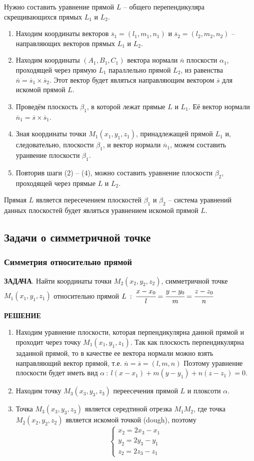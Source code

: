 \documentclass{article}
\begin{document}
Нужно составить уравнение прямой $L$ -- общего перепендикуляра скрещивающихся прямых $L_1$ и $L_2$.
\begin{enumerate}
    \item Находим координаты векторов $\overline{s}_1=(l_1,m_1,n_1)$ и $\overline{s}_2=(l_2,m_2,n_2)$ -- направляющих векторов прямых $L_1$ и $L_2$.
    \item Находим координаты $(A_1,B_1,C_1)$ вектора нормали $\overline{n}$ плоскости $\alpha_1$, проходящей через прямую $L_1$ параллельно прямой $L_2$, из равенства $\overline{n}=\overline{s}_1\times\overline{s}_2$. Этот вектор будет являться направляющим вектором $\overline{s}$ для искомой прямой $L$.
    \item Проведём плоскость $\beta_1$, в которой лежат прямые $L$ и $L_1$. Её вектор нормали $\overline{n}_1=\overline{s}\times\overline{s}_1$.
    \item Зная координаты точки $M_1(x_1,y_1,z_1)$, принадлежащей прямой $L_1$ и, следовательно, плоскости $\beta_1$, и вектор нормали $\overline{n}_1$, можем составить уранвение плоскости $\beta_1$.
    \item Повторив шаги (2) -- (4), можно составить уравнение плоскости $\beta_2$, проходящей через прямые $L$ и $L_2$.
\end{enumerate}
Прямая $L$ является пересечением плоскостей $\beta_1$ и $\beta_2$ -- система уравнений данных плоскостей будет являться уравнением искомой прямой $L$.

\newpage
\subsection{Задачи о симметричной точке}
\subsubsection{Симметрия относительно прямой}
\textbf{ЗАДАЧА}. Найти координаты точки $M_2(x_2,y_2,z_2)$, симметричной точке $M_1(x_1,y_1,z_1)$ относительно прямой $L\::\: \cfrac{x-x_0}{l}=\cfrac{y-y_0}{m}=\cfrac{z-z_0}{n}$

\textbf{РЕШЕНИЕ}
\begin{enumerate}
    \item Находим уравнение плоскости, которая перпендикулярна данной прямой и проходит через точку $M_1(x_1,y_1,z_1)$. Так как плоскость перпендикулярна заданной прямой, то в качестве ее вектора нормали можно взять направляющий вектор прямой, т.е. $\overline{n}=\overline{s}=(l,m,n)$ Поэтому уравнение плоскости будет иметь вид $\alpha\::\:l(x-x_1)+m(y-y_1)+n(z-z_1)=0$.
    \item Находим точку $M_3(x_3,y_3,z_3)$ переесечения прямой $L$ и плоксоти $\alpha$.
    \item Точка $M_3(x_3,y_3,z_3)$ является середтиной отрезка $M_1M_2$, где точка $M_2(x_2,y_2,z_2)$ является искомой точкой (dough), поэтому 
    $$ \begin{cases}x_2=2x_3-x_1\\y_2=2y_3-y_1\\z_2=2z_3-z_1 \end{cases} $$
\end{enumerate}
\end{document}
